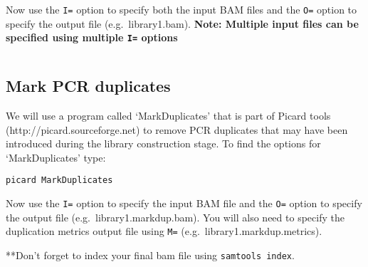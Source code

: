 \documentclass[11pt]{article}
\makeatletter
\newcommand{\boxspacing}{\kern\kvtcb@left@rule\kern\kvtcb@boxsep}
\newcommand{\prompt}[4]{
        \ttfamily\llap{{\color{#2}[#3]:\hspace{3pt}#4}}\vspace{-\baselineskip}
    }
\makeatother
\begin{document}
    Now use the \texttt{I=} option to specify both the input BAM files and
the \texttt{O=} option to specify the output file (e.g.~library1.bam).
\textbf{Note: Multiple input files can be specified using multiple
\texttt{I=} options}

    \begin{tcolorbox}[breakable, size=fbox, boxrule=1pt, pad at break*=1mm,colback=cellbackground, colframe=cellborder]
\prompt{In}{incolor}{ }{\boxspacing}
\begin{Verbatim}[commandchars=\\\{\}]

\end{Verbatim}
\end{tcolorbox}

    \hypertarget{mark-pcr-duplicates}{%
\subsection{Mark PCR duplicates}\label{mark-pcr-duplicates}}

We will use a program called `MarkDuplicates' that is part of Picard
tools (http://picard.sourceforge.net) to remove PCR duplicates that may
have been introduced during the library construction stage. To find the
options for `MarkDuplicates' type:

    \begin{tcolorbox}[breakable, size=fbox, boxrule=1pt, pad at break*=1mm,colback=cellbackground, colframe=cellborder]
\prompt{In}{incolor}{ }{\boxspacing}
\begin{Verbatim}[commandchars=\\\{\}]
picard MarkDuplicates
\end{Verbatim}
\end{tcolorbox}

    Now use the \texttt{I=} option to specify the input BAM file and the
\texttt{O=} option to specify the output file
(e.g.~library1.markdup.bam). You will also need to specify the
duplication metrics output file using \texttt{M=}
(e.g.~library1.markdup.metrics).

**Don't forget to index your final bam file using
\texttt{samtools\ index}.

    \begin{tcolorbox}[breakable, size=fbox, boxrule=1pt, pad at break*=1mm,colback=cellbackground, colframe=cellborder]
\prompt{In}{incolor}{ }{\boxspacing}
\begin{Verbatim}[commandchars=\\\{\}]

\end{Verbatim}
\end{tcolorbox}
\end{document}
